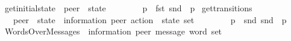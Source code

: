 \begin{isabellebody}
\ get{\isacharunderscore}{\kern0pt}initial{\isacharunderscore}{\kern0pt}state\ {\isacharcolon}{\kern0pt}{\isacharcolon}{\kern0pt}\ {\isachardoublequoteopen}{\isacharprime}{\kern0pt}peer\ {\isasymRightarrow}\ {\isacharprime}{\kern0pt}state{\isachardoublequoteclose}\ \ {\isacharparenleft}{\kern0pt}{\isachardoublequoteopen}{\isasymI}\ {\isacharunderscore}{\kern0pt}{\isachardoublequoteclose}\ {\isacharbrackleft}{\kern0pt}{}{}{\isacharbrackright}{\kern0pt}\ {}{}{}{\isacharparenright}{\kern0pt}\ \isanewline
\ \ {\isachardoublequoteopen}{\isasymI}{\isacharparenleft}{\kern0pt}p{\isacharparenright}{\kern0pt}\ {\isasymequiv}\ fst\ {\isacharparenleft}{\kern0pt}snd\ {\isacharparenleft}{\kern0pt}{\isasymA}\ p{\isacharparenright}{\kern0pt}{\isacharparenright}{\kern0pt}{\isachardoublequoteclose}\isanewline
\isanewline
{}\isamarkupfalse%
\ get{\isacharunderscore}{\kern0pt}transitions\isanewline
\ \ {\isacharcolon}{\kern0pt}{\isacharcolon}{\kern0pt}\ {\isachardoublequoteopen}{\isacharprime}{\kern0pt}peer\ {\isasymRightarrow}\ {\isacharparenleft}{\kern0pt}{\isacharprime}{\kern0pt}state\ {\isasymtimes}\ {\isacharparenleft}{\kern0pt}{\isacharprime}{\kern0pt}information{\isacharcomma}{\kern0pt}\ {\isacharprime}{\kern0pt}peer{\isacharparenright}{\kern0pt}\ action\ {\isasymtimes}\ {\isacharprime}{\kern0pt}state{\isacharparenright}{\kern0pt}\ set{\isachardoublequoteclose}\ \ {\isacharparenleft}{\kern0pt}{\isachardoublequoteopen}{\isasymR}\ {\isacharunderscore}{\kern0pt}{\isachardoublequoteclose}\ {\isacharbrackleft}{\kern0pt}{}{}{\isacharbrackright}{\kern0pt}\ {}{}{}{\isacharparenright}{\kern0pt}\ \isanewline
\ \ {\isachardoublequoteopen}{\isasymR}{\isacharparenleft}{\kern0pt}p{\isacharparenright}{\kern0pt}\ {\isasymequiv}\ snd\ {\isacharparenleft}{\kern0pt}snd\ {\isacharparenleft}{\kern0pt}{\isasymA}\ p{\isacharparenright}{\kern0pt}{\isacharparenright}{\kern0pt}{\isachardoublequoteclose}\isanewline
\isanewline
{}\isamarkupfalse%
\ WordsOverMessages\ {\isacharcolon}{\kern0pt}{\isacharcolon}{\kern0pt}\ {\isachardoublequoteopen}{\isacharparenleft}{\kern0pt}{\isacharprime}{\kern0pt}information{\isacharcomma}{\kern0pt}\ {\isacharprime}{\kern0pt}peer{\isacharparenright}{\kern0pt}\ message\ word\ set{\isachardoublequoteclose}\ \ {\isacharparenleft}{\kern0pt}{\isachardoublequoteopen}{\isasymM}\isactrlsup {\isacharasterisk}{\kern0pt}{\isachardoublequoteclose}\ {}{}{}{\isacharparenright}{\kern0pt}\ \isanewline

\end{isabellebody}
